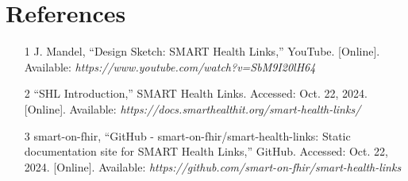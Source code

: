 \documentclass[12pt,a4paper]{article}
\begin{document}
\section*{References}
\begin{enumerate}
    \item [1] J. Mandel, “Design Sketch: SMART Health Links,” YouTube. [Online]. Available: \textit{https://www.youtube.com/watch?v=SbM9I20lH64}
    \item [2] “SHL Introduction,” SMART Health Links. Accessed: Oct. 22, 2024. [Online]. Available: \textit{https://docs.smarthealthit.org/smart-health-links/}
    \item [3] smart-on-fhir, “GitHub - smart-on-fhir/smart-health-links: Static documentation site for SMART Health Links,” GitHub. Accessed: Oct. 22, 2024. [Online]. Available: \textit{https://github.com/smart-on-fhir/smart-health-links}

\end{enumerate}
\end{document}
